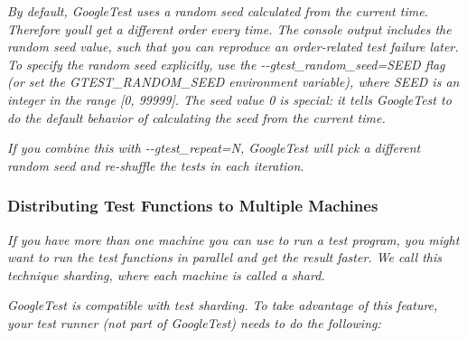{\itshape By default, Google\+Test uses a random seed calculated from the current time. Therefore you\textquotesingle{}ll get a different order every time. The console output includes the random seed value, such that you can reproduce an order-\/related test failure later. To specify the random seed explicitly, use the {\ttfamily -\/-\/gtest\+\_\+random\+\_\+seed=S\+E\+ED} flag (or set the {\ttfamily G\+T\+E\+S\+T\+\_\+\+R\+A\+N\+D\+O\+M\+\_\+\+S\+E\+ED} environment variable), where {\ttfamily S\+E\+ED} is an integer in the range \mbox{[}0, 99999\mbox{]}. The seed value 0 is special\+: it tells Google\+Test to do the default behavior of calculating the seed from the current time.}

{\itshape If you combine this with {\ttfamily -\/-\/gtest\+\_\+repeat=N}, Google\+Test will pick a different random seed and re-\/shuffle the tests in each iteration.}

{\itshape \subsubsection*{Distributing Test Functions to Multiple Machines}}

{\itshape }

{\itshape If you have more than one machine you can use to run a test program, you might want to run the test functions in parallel and get the result faster. We call this technique {\itshape sharding}, where each machine is called a {\itshape shard}.}

{\itshape Google\+Test is compatible with test sharding. To take advantage of this feature, your test runner (not part of Google\+Test) needs to do the following\+:}

